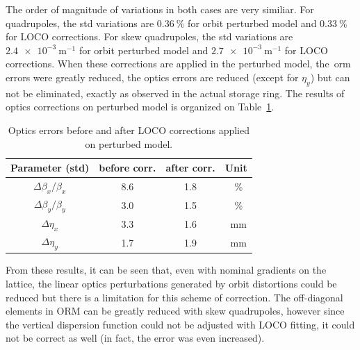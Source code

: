 The order of magnitude of variations in both cases are very similiar. For quadrupoles, the std variations are $\SI{0.36}{\%}$ for orbit perturbed model and $\SI{0.33}{\%}$ for LOCO corrections. For skew quadrupoles, the std variations are $\SI{2.4e-3}{\meter^{-1}}$ for orbit perturbed model and $\SI{2.7e-3}{\meter^{-1}}$ for LOCO corrections. When these corrections are applied in the perturbed model, the~\gls{orm} errors were greatly reduced, the optics errors are reduced (except for $\eta_y$) but can not be eliminated, exactly as observed in the actual storage ring. The results of optics corrections on perturbed model is organized on Table~\ref{tab:params_corr}.
\begin{table}[h!]
    \centering
    \caption{Optics errors before and after LOCO corrections applied on perturbed model.}
    \label{tab:params_corr}
    \begin{tabular}{cccc}
        \toprule\toprule
        Parameter (std) & before corr. & after corr. & Unit\\
        \hline
        $\Delta\beta_x/\beta_x$ & \SI{8.6}{} & \SI{1.8}{} & \SI{}{\%}\\
        $\Delta\beta_y/\beta_y$ & \SI{3.0}{} & \SI{1.5}{} & \SI{}{\%}\\
        $\Delta\eta_x$ & \SI{3.3}{} & \SI{1.6}{} & \SI{}{\milli\meter} \\
        $\Delta\eta_y$ & \SI{1.7}{} & \SI{1.9}{} & \SI{}{\milli\meter}\\    
        \bottomrule\bottomrule
    \end{tabular}
\end{table}


From these results, it can be seen that, even with nominal gradients on the lattice, the linear optics perturbations generated by orbit distortions could be reduced but there is a limitation for this scheme of correction. The off-diagonal elements in ORM can be greatly reduced with skew quadrupoles, however since the vertical dispersion function could not be adjusted with LOCO fitting, it could not be correct as well (in fact, the error was even increased). 

